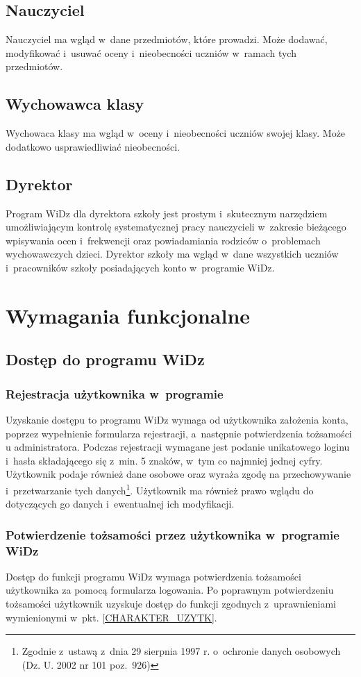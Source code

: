 \documentclass[12pt,leqno,twoside]{mwart}
\begin{document}
\subsection{Nauczyciel}
\noindent Nauczyciel ma wgląd w~dane przedmiotów, które prowadzi. Może dodawać, modyfikować i~usuwać oceny i~nieobecności uczniów w~ramach tych przedmiotów.

\subsection{Wychowawca klasy}
\noindent Wychowaca klasy ma wgląd w~oceny i~nieobecności uczniów swojej klasy. Może dodatkowo usprawiedliwiać nieobecności.

\subsection{Dyrektor}
\noindent Program WiDz dla dyrektora szkoły jest prostym i~skutecznym narzędziem umożliwiającym kontrolę systematycznej pracy nauczycieli w~zakresie bieżącego wpisywania ocen i~frekwencji oraz powiadamiania rodziców o~problemach wychowawczych dzieci. Dyrektor szkoły ma wgląd w~dane wszystkich uczniów i~pracowników szkoły posiadających konto w~programie WiDz.

\section{Wymagania funkcjonalne}
\subsection{Dostęp do programu WiDz}
\subsubsection{Rejestracja użytkownika w~programie}
\noindent Uzyskanie dostępu to programu WiDz wymaga od użytkownika założenia konta, poprzez wypełnienie formularza rejestracji, a~następnie potwierdzenia tożsamości u administratora. Podczas rejestracji wymagane jest podanie unikatowego loginu i~hasła składającego się z~min. 5 znaków, w~tym co najmniej jednej cyfry. Użytkownik podaje również dane osobowe oraz wyraża zgodę na przechowywanie i~przetwarzanie tych danych\footnote{Zgodnie z~ustawą z~dnia 29 sierpnia 1997 r. o~ochronie danych osobowych (Dz. U. 2002 nr 101 poz.~926)}. Użytkownik ma również prawo wglądu do dotyczących go danych i~ewentualnej ich modyfikacji.

\subsubsection{Potwierdzenie tożsamości przez użytkownika w~programie WiDz}
\noindent Dostęp do funkcji programu WiDz wymaga potwierdzenia tożsamości użytkownika za pomocą formularza logowania. Po poprawnym potwierdzeniu tożsamości użytkownik uzyskuje dostęp do funkcji zgodnych z~uprawnieniami wymienionymi w~pkt. \ref{CHARAKTER_UZYTK}. 
\end{document}
